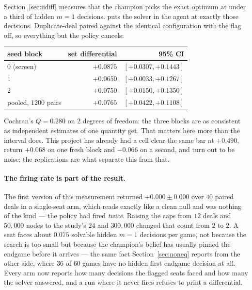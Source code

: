 \documentclass[11pt,a4paper]{article}
\begin{document}
Section~\ref{sec:iidiff} measures that the champion picks the exact optimum at
under a third of hidden $m = 1$ decisions.  puts
the solver in the agent at exactly those decisions. Duplicate-deal paired
against the identical configuration with the flag off, so everything but the
policy cancels:

\begin{center}
\begin{tabular}{lrr}
\toprule
seed block & set differential & 95\% CI \\
\midrule
$0$ (screen) & $+0.0875$ & $[+0.0307, +0.1443]$ \\
$1$ & $+0.0650$ & $[+0.0033, +0.1267]$ \\
$2$ & $+0.0750$ & $[+0.0150, +0.1350]$ \\
\midrule
pooled, $1200$ pairs & $\mathbf{+0.0765}$ & $\mathbf{[+0.0422, +0.1108]}$ \\
\bottomrule
\end{tabular}
\end{center}

Cochran's $Q = 0.280$ on $2$ degrees of freedom: the three blocks are as
consistent as independent estimates of one quantity get. That matters here more
than the interval does. This project has already had a cell clear the same bar
at $+0.490$, return $+0.068$ on one fresh block and $-0.066$ on a second, and
turn out to be noise; the replications are what separate this from that.

\paragraph{The firing rate is part of the result.} The first version of this
measurement returned $+0.000 \pm 0.000$ over $40$ paired deals in a
single-seat arm, which reads exactly like a clean null and was nothing of the
kind --- the policy had fired \emph{twice}. Raising the caps from $12$ deals
and $50{,}000$ nodes to the study's $24$ and $300{,}000$ changed that count from
$2$ to $2$. A seat faces about $0.075$ solvable hidden $m = 1$ decisions per
game, not because the search is too small but because the champion's belief has
usually pinned the endgame before it arrives --- the same fact
Section~\ref{sec:noneq} reports from the other side, where $36$ of $60$ games
have no hidden first endgame decision at all. Every arm now reports how many
decisions the flagged seats faced and how many the solver answered, and a run
where it never fires refuses to print a differential.
\end{document}

